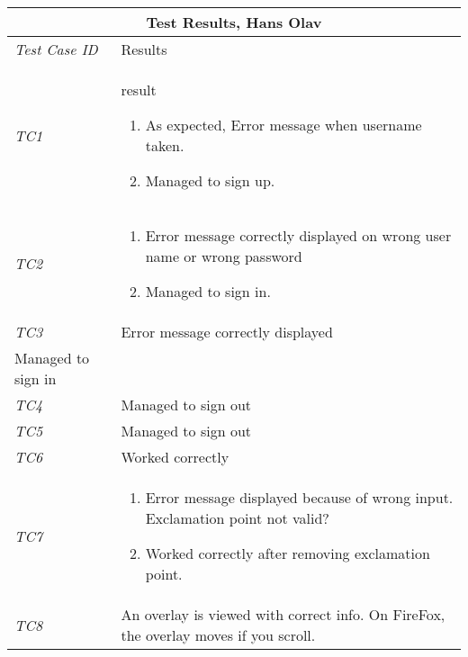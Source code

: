 \begin{minipage}{\linewidth}
\setlength{\tabcolsep}{15pt}
\centering
{}
\begin{tabular}{ |l|p{70mm}| }
	\hline
	\multicolumn{2}{|c|}{\cellcolor{gray!25} \textbf{Test Results, Hans Olav}} \\
	\hline
	\it{\cellcolor{gray!25}Test Case ID} & {\cellcolor{gray!25} Results } \\
	\hline
	\it{\cellcolor{gray!25}TC1} & result \begin{enumerate}[label=\alph*)]
	                                       \item As expected, Error message when username taken.
	                                       \item Managed to sign up.
	                                     \end{enumerate}\\ \hline
	\it{\cellcolor{gray!25}TC2} & \begin{enumerate}[label=\alph*)]
	                                \item Error message correctly displayed on wrong user name or wrong password
	                                \item Managed to sign in.
	                              \end{enumerate}\\ \hline
	\it{\cellcolor{gray!25}TC3} & Error message correctly displayed
\\ Managed to sign in \\ \hline
	\it{\cellcolor{gray!25}TC4} & Managed to sign out \\ \hline
	\it{\cellcolor{gray!25}TC5} & Managed to sign out \\ \hline
	\it{\cellcolor{gray!25}TC6} & Worked correctly \\ \hline
	\it{\cellcolor{gray!25}TC7} & \begin{enumerate}[label=\alph*)]
	                                \item Error message displayed because of wrong input. Exclamation point not valid?
	                                \item Worked correctly after removing exclamation point.
	                              \end{enumerate}\\ \hline
	\it{\cellcolor{gray!25}TC8} & An overlay is viewed with correct info. On FireFox, the overlay moves if you scroll. \\ \hline

\end{tabular}
\end{minipage}
